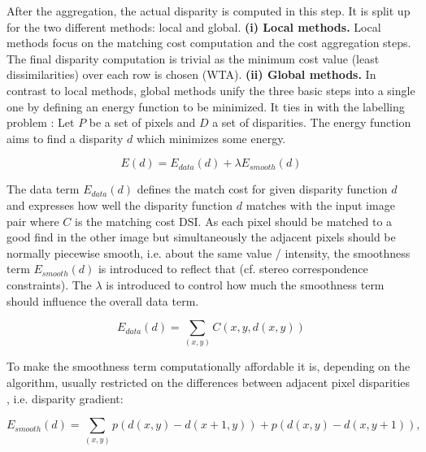 After the aggregation, the actual disparity is computed in this step.
It is split up for the two different methods: local and global.
\newline\newline \noindent \textbf{(i) Local methods.} Local methods focus on the matching cost computation and the cost aggregation steps.
The final disparity computation is trivial as the minimum cost value (least dissimilarities) over each row is chosen (WTA).
\newline\newline\noindent \textbf{(ii) Global methods.} In contrast to local methods, global methods unify the three basic steps into a single one by defining an energy function to be minimized.
It ties in with the labelling problem \citep{tamassia2013handbook}:
\newline\newline\noindent Let $P$ be a set of pixels and $D$ a set of disparities. The energy function aims to find a disparity $d$ which minimizes some energy.

\begin{equation}
  E(d) = E_{data}(d) + \lambda E_{smooth}(d)
\end{equation}

\noindent The data term $E_{data}(d)$ defines the match cost for given disparity function $d$ and expresses how well the disparity function $d$ matches with the input image pair where $C$ is the matching cost DSI.
As each pixel should be matched to a good find in the other image but simultaneously the adjacent pixels should be normally piecewise smooth, i.e. about the same value / intensity, the smoothness term $E_{smooth}(d)$ is introduced to reflect that (cf. stereo correspondence constraints).
The $\lambda$ is introduced to control how much the smoothness term should influence the overall data term.

\begin{equation}
  E_{data}(d) = \sum_{(x,y)} C(x,y,d(x,y)) 
\end{equation}

\noindent To make the smoothness term computationally affordable it is, depending on the algorithm, usually restricted on the differences between adjacent pixel disparities \citep{scharstein2002taxonomy, cyganek2011introduction}, i.e. disparity gradient:

\begin{equation}
  E_{smooth}(d) = \sum_{(x,y)} p(d(x,y) - d(x+1,y)) + p(d(x,y) - d(x,y+1)),
\end{equation}

